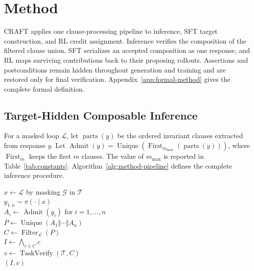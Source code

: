 \section{Method}\label{sec:method}

CRAFT applies one clause-processing pipeline to inference, SFT target
construction, and RL credit assignment.  Inference verifies the composition
of the filtered clause union, SFT serializes an accepted composition as one
response, and RL maps surviving contributions back to their proposing
rollouts.  Assertions and postconditions remain hidden throughout generation
and training and are restored only for final verification.
Appendix~\ref{app:formal-method} gives the complete formal definition.

\subsection{Target-Hidden Composable Inference}
\label{sec:method:core}
\label{sec:method:inference}

For a masked loop \(\mathcal L\), let \(\operatorname{parts}(y)\) be the
ordered invariant clauses extracted from response \(y\).  Let
\(\operatorname{Admit}(y)=\operatorname{Unique}(
\operatorname{First}_{m_{\max}}(\operatorname{parts}(y)))\), where
\(\operatorname{First}_{m}\) keeps the first \(m\) clauses.  The value of
\(m_{\max}\) is reported in Table~\ref{tab:constants}.
Algorithm~\ref{alg:method-pipeline} defines the complete inference procedure.

\begin{algorithm}[H]
\caption{Rollout--decompose--pool--filter--compose}
\label{alg:method-pipeline}
\begin{algorithmic}
\algline \(x\leftarrow\mathcal L\) by masking \(\mathcal G\) in \(\mathcal T\)\\
\algline \(y_{1:n}\sim\pi(\cdot\mid x)\)\\
\algline \(A_i\leftarrow\operatorname{Admit}(y_i)\) for \(i=1,\ldots,n\)
  \\
\algline \(P\leftarrow\operatorname{Unique}(A_1\Vert\cdots\Vert A_n)\)
  \\
\algline \(C\leftarrow\operatorname{Filter}_{\mathcal L}(P)\)\\
\algline \(I\leftarrow\bigwedge_{c\in C}c\)\\
\algline \(v\leftarrow\operatorname{TaskVerify}(\mathcal T,C)\)\\
\algline {} \((I,v)\)\\
\end{algorithmic}
\end{algorithm}

